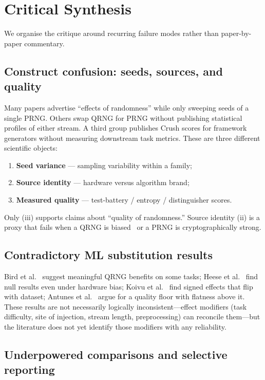 \section{Critical Synthesis}
\label{sec:critique}

We organise the critique around recurring failure modes rather than paper-by-paper commentary.

\subsection{Construct confusion: seeds, sources, and quality}

Many papers advertise ``effects of randomness'' while only sweeping seeds of a single PRNG.
Others swap QRNG for PRNG without publishing statistical profiles of either stream.
A third group publishes Crush scores for framework generators without measuring downstream task metrics.
These are three different scientific objects:
\begin{enumerate}[leftmargin=*]
  \item \textbf{Seed variance} --- sampling variability within a family;
  \item \textbf{Source identity} --- hardware versus algorithm brand;
  \item \textbf{Measured quality} --- test-battery / entropy / distinguisher scores.
\end{enumerate}
Only (iii) supports claims about ``quality of randomness.''
Source identity (ii) is a proxy that fails when a QRNG is biased~\cite{heese2024biased} or a PRNG is cryptographically strong.

\subsection{Contradictory ML substitution results}

Bird et al.~\cite{bird2019softcomputing} suggest meaningful QRNG benefits on some tasks; Heese et al.~\cite{heese2024biased} find null results even under hardware bias; Koivu et al.~\cite{koivu2022dropout} find signed effects that flip with dataset; Antunes et al.~\cite{antunes2025influence} argue for a quality floor with flatness above it.
These results are not necessarily logically inconsistent---effect modifiers (task difficulty, site of injection, stream length, preprocessing) can reconcile them---but the literature does not yet identify those modifiers with any reliability.

\subsection{Underpowered comparisons and selective reporting}


